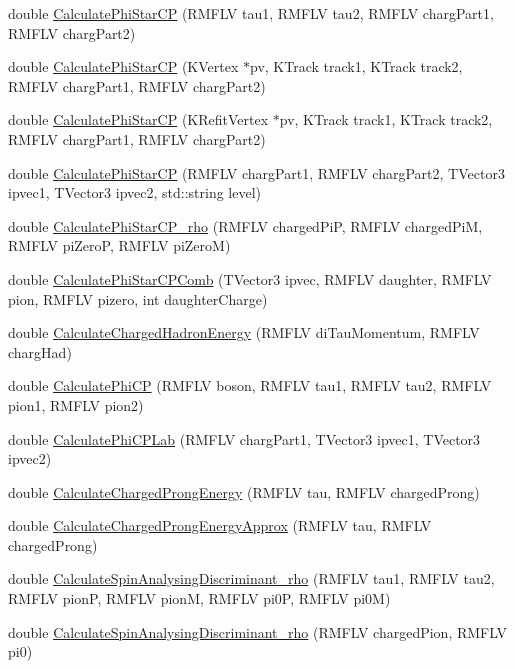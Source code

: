\begin{DoxyCompactItemize}
\item 
double \hyperlink{classCPQuantities_ad58f8cf3eb5bbcd779c16cf55271e263}{CalculatePhiStarCP} (RMFLV tau1, RMFLV tau2, RMFLV chargPart1, RMFLV chargPart2)
\item 
double \hyperlink{classCPQuantities_a1f725895e37c3c82be878f6e1de13da9}{CalculatePhiStarCP} (KVertex $\ast$pv, KTrack track1, KTrack track2, RMFLV chargPart1, RMFLV chargPart2)
\item 
double \hyperlink{classCPQuantities_a42c490c334c7d6e5a0fa5c46319be1fa}{CalculatePhiStarCP} (KRefitVertex $\ast$pv, KTrack track1, KTrack track2, RMFLV chargPart1, RMFLV chargPart2)
\item 
double \hyperlink{classCPQuantities_ae5788e20756f36ca936b5a9be6df7499}{CalculatePhiStarCP} (RMFLV chargPart1, RMFLV chargPart2, TVector3 ipvec1, TVector3 ipvec2, std::string level)
\item 
double \hyperlink{classCPQuantities_a9c1bb591c0cd39d7811f55ec11e85cf3}{CalculatePhiStarCP\_\-rho} (RMFLV chargedPiP, RMFLV chargedPiM, RMFLV piZeroP, RMFLV piZeroM)
\item 
double \hyperlink{classCPQuantities_ab99f363dffcef31b9586c837345f8de3}{CalculatePhiStarCPComb} (TVector3 ipvec, RMFLV daughter, RMFLV pion, RMFLV pizero, int daughterCharge)
\item 
double \hyperlink{classCPQuantities_af2aecefa85b7f167105e077382c9c6d0}{CalculateChargedHadronEnergy} (RMFLV diTauMomentum, RMFLV chargHad)
\item 
double \hyperlink{classCPQuantities_a113b0671c39aba801291753fbe2fb4d8}{CalculatePhiCP} (RMFLV boson, RMFLV tau1, RMFLV tau2, RMFLV pion1, RMFLV pion2)
\item 
double \hyperlink{classCPQuantities_acff7d59bea15f181b1dfe66c43b49577}{CalculatePhiCPLab} (RMFLV chargPart1, TVector3 ipvec1, TVector3 ipvec2)
\item 
double \hyperlink{classCPQuantities_ac5089fe60e10d6185702deab951d9d90}{CalculateChargedProngEnergy} (RMFLV tau, RMFLV chargedProng)
\item 
double \hyperlink{classCPQuantities_a89656a406f278bdda8cadea631bee6aa}{CalculateChargedProngEnergyApprox} (RMFLV tau, RMFLV chargedProng)
\item 
double \hyperlink{classCPQuantities_a41459ffae38ce33912733b24136b0859}{CalculateSpinAnalysingDiscriminant\_\-rho} (RMFLV tau1, RMFLV tau2, RMFLV pionP, RMFLV pionM, RMFLV pi0P, RMFLV pi0M)
\item 
double \hyperlink{classCPQuantities_a21ad326d0dc204211a393fc9f0cbc844}{CalculateSpinAnalysingDiscriminant\_\-rho} (RMFLV chargedPion, RMFLV pi0)

\end{DoxyCompactItemize}
